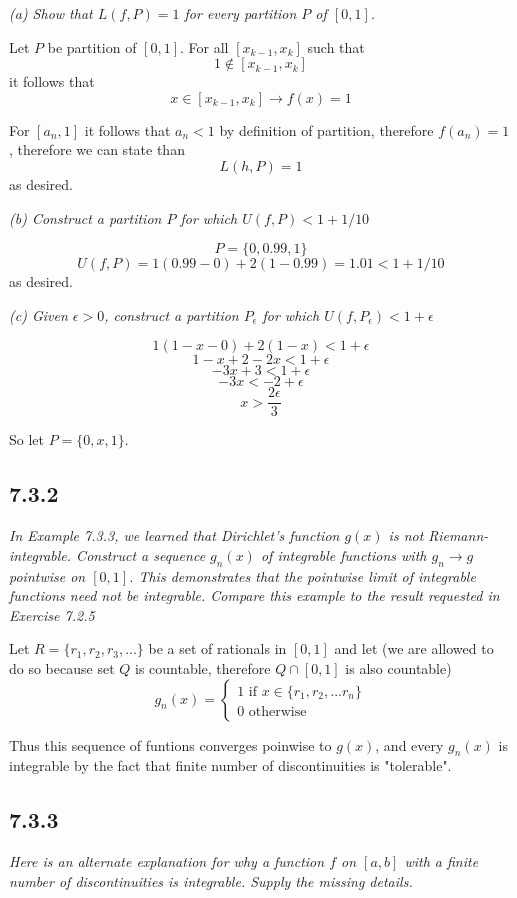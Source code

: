 \documentclass[11pt,oneside,titlepage]{book}
\begin{document}
\textit{(a) Show that $L(f, P) = 1$ for every partition $P$ of $[0, 1]$.}

Let $P$ be partition of $[0, 1]$. For all $[x_{k - 1}, x_k]$ such that
$$1 \notin [x_{k - 1}, x_k] $$
it follows that
$$x \in [x_{k - 1}, x_k] \to f(x) = 1$$

For $[a_n, 1]$ it follows that $a_n < 1$ by definition of partition, therefore
$f(a_n)  = 1$, therefore we can state than
$$L(h, P) = 1$$
as desired.

\textit{(b) Construct a partition $P$ for which $U(f, P) < 1 + 1/10$}

$$P = \{0, 0.99, 1\}$$
$$U(f, P) = 1 (0.99 - 0) + 2(1 - 0.99) = 1.01 < 1 + 1/10$$
as desired.

\textit{(c) Given $\epsilon > 0$, construct a partition $P_\epsilon$ for which
  $U(f, P_\epsilon) < 1 + \epsilon$}

$$1 (1 - x - 0) + 2(1 - x) < 1 + \epsilon$$
$$1 - x + 2 - 2 x < 1 + \epsilon$$
$$-3x + 3 < 1 + \epsilon$$
$$-3x  < -2 + \epsilon$$
$$x  > \frac{2 \epsilon}{3}$$

So let $P = \{0, x, 1\}$.

\subsection*{7.3.2}
\textit{In Example 7.3.3, we learned that Dirichlet's function $g(x)$ is not
  Riemann-integrable. Construct a sequence $g_n(x)$ of integrable functions
  with $g_n \to g$ pointwise on $[0, 1]$. This demonstrates that the pointwise
  limit of integrable functions need not be integrable. Compare this example
  to the result requested in Exercise 7.2.5}

Let $R = \{r_1, r_2, r_3, ... \}$ be a set of rationals in $[0, 1]$ and let
(we are allowed to do so because set $Q$ is countable, therefore
$Q \cap [0, 1]$ is also countable)
$$g_n(x) =
\begin{cases}
  1 \text{ if } x \in \{r_1, r_2, ... r_n\} \\
  0 \text{ otherwise}
\end{cases}
$$

Thus this sequence of funtions converges poinwise to $g(x)$, and every $g_n(x)$
is integrable by the fact that finite number of discontinuities is "tolerable".

\subsection*{7.3.3}
\textit{Here is an alternate explanation for why a function $f$ on $[a, b]$
  with a finite number of discontinuities is integrable. Supply the missing
  details.}
\end{document}
